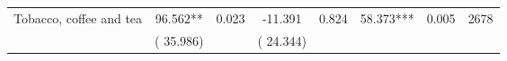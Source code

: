\begin{tabular}{l*{7}{c}}
 Tobacco, coffee and tea       &             96.562**       &        0.023  &            -11.391       &        0.824  &             58.373***       &              0.005 &  2678 \\ 
                       &       (      35.986)             &                               &       (      24.344)                     &                               &                                               &                                &                      \\ 

\hline \end{tabular}
